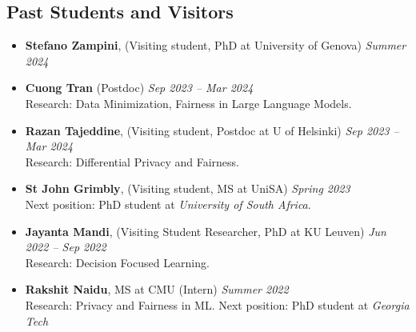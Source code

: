 \subsection*{Past Students and Visitors}
\begin{itemize}
  \item \textbf{Stefano Zampini}, ({\sc Visiting student}, PhD at University of Genova)  \hfill{\em Summer 2024}

  \item \textbf{Cuong Tran} ({\sc Postdoc}) 
  \hfill{\em Sep 2023 -- Mar 2024}\\
  {\sc Research}: Data Minimization, Fairness in Large Language Models.

  \item \textbf{Razan Tajeddine}, ({\sc Visiting student}, Postdoc at U of Helsinki) 
  \hfill{\em Sep 2023 -- Mar 2024}\\
  {\sc Research}: Differential Privacy and Fairness.

  \item \textbf{St John Grimbly}, ({\sc Visiting student}, MS at UniSA) 
  \hfill{\em Spring 2023}\\
  {\sc Next position:} PhD student at \textit{University of South Africa}.

  \item \textbf{Jayanta Mandi}, ({\sc Visiting Student Researcher}, PhD at KU Leuven) 
  \hfill{\em Jun 2022 -- Sep 2022}\\
  {\sc Research}: Decision Focused Learning.

  \item \textbf{Rakshit Naidu}, MS at CMU ({\sc Intern}) \hfill{\em Summer 2022}\\
  {\sc Research:} Privacy and Fairness in ML. 
  {\sc Next position:} PhD student at \textit{Georgia Tech}
\end{itemize}

